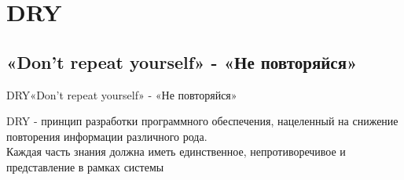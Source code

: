\documentclass[10pt]{beamer}
\begin{document}
\section{DRY}
\subsection{«Don’t repeat yourself» - «Не повторяйся»}
\begin{frame}[fragile]{DRY}{«Don’t repeat yourself» - «Не повторяйся»}

DRY - принцип разработки программного обеспечения, нацеленный на снижение повторения информации различного рода.
\\
Каждая часть знания должна иметь единственное, непротиворечивое и представление в рамках системы

\end{frame}
\end{document}
